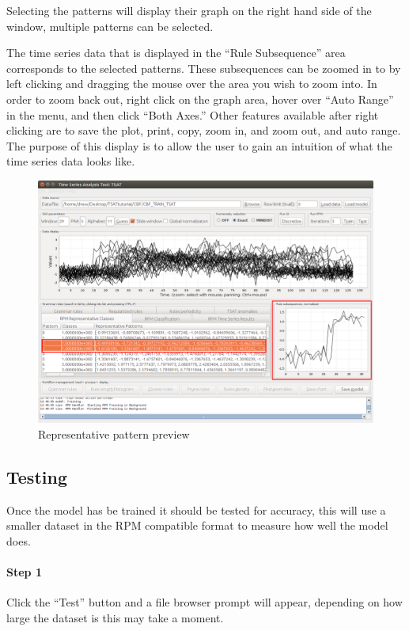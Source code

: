 \documentclass[titlepage, letterpaper, 12pt]{article}
\begin{document}
\newpage
Selecting the patterns will display their graph on the right hand side of the window, multiple patterns can be selected.

The time series data that is displayed in the ``Rule Subsequence'' area corresponds to the selected patterns.  These subsequences can be zoomed in to by left clicking and dragging the mouse over the area you wish to zoom into.  In order to zoom back out, right click on the graph area, hover over ``Auto Range'' in the menu, and then click ``Both Axes.''  Other features available after right clicking are to save the plot, print, copy, zoom in, and zoom out, and auto range.  The purpose of this display is to allow the user to gain an intuition of what the time series data looks like.

\begin{figure}[H]
	\includegraphics[width=\textwidth]{TSAT-training-step-6}
	\caption{Representative pattern preview}
	\label{fig:TSAT-training-step-6}
\end{figure}


\subsection{Testing}
\label{RPMTest}
Once the model has be trained it should be tested for accuracy, this will use a smaller dataset in the RPM compatible format to measure how well the model does. 
\newpage
\paragraph{Step 1}
Click the ``Test'' button and a file browser prompt will appear, depending on how large the dataset is this may take a moment. 
\end{document}
